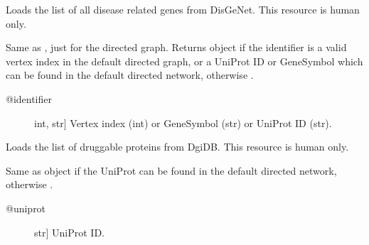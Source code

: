 \documentclass[letterpaper,10pt,english]{sphinxmanual}
\begin{document}
\begin{fulllineitems}
\begin{fulllineitems}
\begin{description}
\end{description}

\end{fulllineitems}


\begin{fulllineitems}
\label{\detokenize{main:pypath.main.PyPath.disease_genes_list}}
Loads the list of all disease related genes from DisGeNet.
This resource is human only.

\end{fulllineitems}


\begin{fulllineitems}
\label{\detokenize{main:pypath.main.PyPath.dp}}
Same as , just for the directed graph.
Returns  object if the identifier
is a valid vertex index in the default directed graph,
or a UniProt ID or GeneSymbol which can be found in the
default directed network, otherwise .
\begin{description}
\item[{@identifier}] \leavevmode{[}int, str{]}
Vertex index (int) or GeneSymbol (str) or UniProt ID (str).

\end{description}

\end{fulllineitems}


\begin{fulllineitems}
\label{\detokenize{main:pypath.main.PyPath.druggability_list}}
Loads the list of druggable proteins from DgiDB.
This resource is human only.

\end{fulllineitems}


\begin{fulllineitems}
\label{\detokenize{main:pypath.main.PyPath.duniprot}}
Same as  object if the UniProt
can be found in the default directed network,
otherwise .
\begin{description}
\item[{@uniprot}] \leavevmode{[}str{]}
UniProt ID.


\end{description}
\end{fulllineitems}
\end{fulllineitems}
\end{document}
